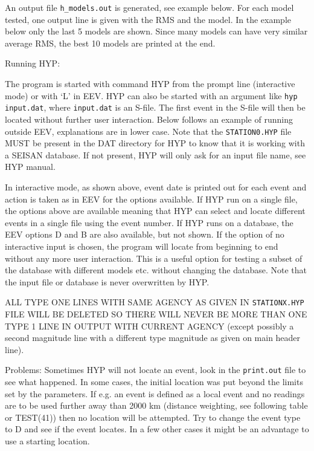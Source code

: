 An output file \texttt{h\_models.out} is generated, see example below. 
For each model tested, one output line is given with the RMS and the 
model. In the example below only the last 5 models are shown. Since 
many models can have very similar average RMS, the best 10 models 
are printed at the end. 



Running HYP: 

The program is started with command HYP from the prompt line 
(interactive mode) or with `L' in EEV. HYP can also be started 
with an argument like \texttt{hyp input.dat}, where 
\texttt{input.dat} is an S-file. The first event in the S-file 
will then be located without further user interaction.  Below 
follows an example of running outside EEV, explanations are in lower 
case. Note that the \texttt{STATION0.HYP} file MUST be present in the DAT 
directory for HYP to know that it is working with a SEISAN database. If not present, HYP will only ask for an input file name, see HYP manual. 



In interactive mode, as shown above, event date is printed out for each event and action is taken as in EEV for the options available. If HYP run on a single file, the options above are available meaning that HYP can select and locate different events in a single file using the event number. If HYP runs on a database, the EEV options D and B are also available, but not shown. If the option of no interactive input is chosen, the program will locate from beginning to end without any more user interaction.  This is a useful option for testing a subset of the database with different models etc. without changing the database. Note that the input file or database is never overwritten by HYP. 

ALL TYPE ONE LINES WITH SAME AGENCY AS GIVEN IN \texttt{STATIONX.HYP} FILE WILL BE DELETED SO THERE WILL NEVER BE MORE THAN ONE TYPE 1 LINE IN OUTPUT WITH CURRENT AGENCY (except possibly a second magnitude line with a different type magnitude as given on main header line).  

Problems: Sometimes HYP will not locate an event, look in the \texttt{print.out} file to see what happened. In some cases, the initial location was put beyond the limits set by the parameters. If e.g. an event is defined as a local event and no readings are to be used further away than 2000 km (distance weighting, see following table or TEST(41)) then no location will be attempted. Try to change the event type to D and see if the event locates. In a few other cases it might be an advantage to use a starting location. 

